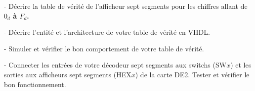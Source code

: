 \medskip

- Décrire la table de vérité de l'afficheur sept segments pour les chiffres allant de \textbf{$0_d$ à $F_d$.}

\medskip

- Décrire l'entité et l'architecture de votre table de vérité en VHDL.

\medskip

- Simuler et vérifier le bon comportement de votre table de vérité.

\medskip

- Connecter les entrées de votre décodeur sept segments aux switchs (SW$x$) et les sorties aux afficheurs sept segments (HEX$x$) de la carte DE2. Tester et vérifier le bon fonctionnement.
